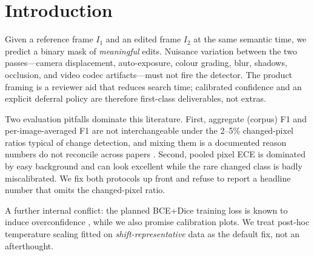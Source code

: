 \section{Introduction}
\label{sec:intro}

Given a reference frame $I_1$ and an edited frame $I_2$ at the same
semantic time, we predict a binary mask of \emph{meaningful} edits.
Nuisance variation between the two passes---camera displacement,
auto-exposure, colour grading, blur, shadows, occlusion, and video
codec artifacts---must not fire the detector. The product framing is a
reviewer aid that reduces search time; calibrated confidence and an
explicit deferral policy are therefore first-class deliverables, not
extras.

Two evaluation pitfalls dominate this literature. First, aggregate
(corpus) F1 and per-image-averaged F1 are not interchangeable under
the 2--5\% changed-pixel ratios typical of change detection, and mixing
them is a documented reason numbers do not reconcile across papers
\cite{corley_2024_reality}. Second, pooled pixel ECE is dominated by
easy background and can look excellent while the rare changed class is
badly miscalibrated. We fix both protocols up front and refuse to
report a headline number that omits the changed-pixel ratio.

A further internal conflict: the planned BCE+Dice training loss is
known to induce overconfidence \cite{mehrtash_2020_calibration,yeung_2023_dscpp},
while we also promise calibration plots. We treat post-hoc temperature
scaling fitted on \emph{shift-representative} data
\cite{guo_2017_calibration,ovadia_2019_shift} as the default fix, not
an afterthought.
